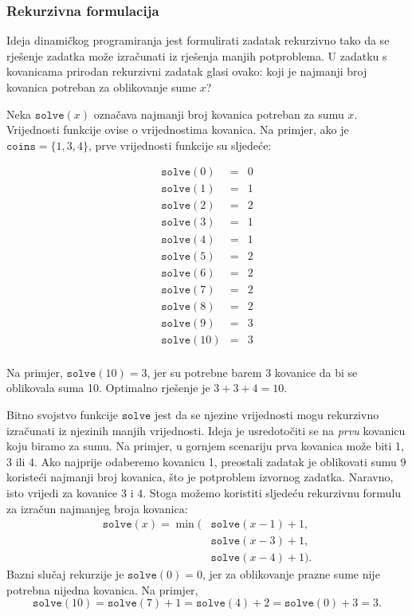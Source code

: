 \subsubsection{Rekurzivna formulacija}

Ideja dinamičkog programiranja jest
formulirati zadatak rekurzivno tako
da se rješenje zadatka može
izračunati iz rješenja manjih
potproblema.
U zadatku s kovanicama prirodan rekurzivni
zadatak glasi ovako:
koji je najmanji broj kovanica
potreban za oblikovanje sume $x$?

Neka $\texttt{solve}(x)$
označava najmanji
broj kovanica potreban za sumu $x$.
Vrijednosti funkcije ovise o
vrijednostima kovanica.
Na primjer, ako je $\texttt{coins} = \{1,3,4\}$,
prve vrijednosti funkcije su sljedeće:

\[
\begin{array}{lcl}
\texttt{solve}(0) & = & 0 \\
\texttt{solve}(1) & = & 1 \\
\texttt{solve}(2) & = & 2 \\
\texttt{solve}(3) & = & 1 \\
\texttt{solve}(4) & = & 1 \\
\texttt{solve}(5) & = & 2 \\
\texttt{solve}(6) & = & 2 \\
\texttt{solve}(7) & = & 2 \\
\texttt{solve}(8) & = & 2 \\
\texttt{solve}(9) & = & 3 \\
\texttt{solve}(10) & = & 3 \\
\end{array}
\]

Na primjer, $\texttt{solve}(10)=3$,
jer su potrebne barem 3 kovanice
da bi se oblikovala suma 10.
Optimalno rješenje je $3+3+4=10$.

Bitno svojstvo funkcije $\texttt{solve}$ jest
da se njezine vrijednosti mogu
rekurzivno izračunati iz njezinih manjih vrijednosti.
Ideja je usredotočiti se na \emph{prvu}
kovanicu koju biramo za sumu.
Na primjer, u gornjem scenariju
prva kovanica može biti 1, 3 ili 4.
Ako najprije odaberemo kovanicu 1,
preostali zadatak je oblikovati sumu 9
koristeći najmanji broj kovanica,
što je potproblem izvornog zadatka.
Naravno, isto vrijedi za kovanice 3 i 4.
Stoga možemo koristiti sljedeću rekurzivnu formulu
za izračun najmanjeg broja kovanica:
\begin{equation*}
\begin{split}
\texttt{solve}(x) = \min( & \texttt{solve}(x-1)+1, \\
                           & \texttt{solve}(x-3)+1, \\
                           & \texttt{solve}(x-4)+1).
\end{split}
\end{equation*}
Bazni slučaj rekurzije je $\texttt{solve}(0)=0$,
jer za oblikovanje prazne sume nije potrebna nijedna kovanica.
Na primjer,
\[ \texttt{solve}(10) = \texttt{solve}(7)+1 = \texttt{solve}(4)+2 = \texttt{solve}(0)+3 = 3.\]

